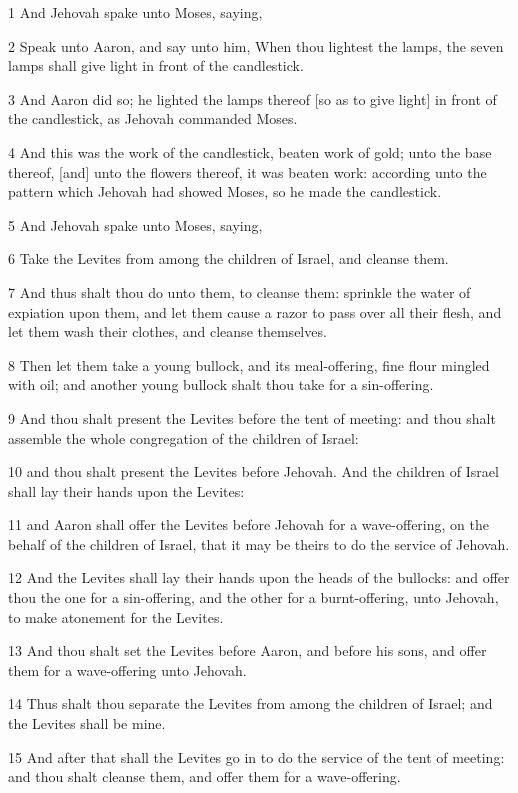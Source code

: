 \par 1 And Jehovah spake unto Moses, saying,
\par 2 Speak unto Aaron, and say unto him, When thou lightest the lamps, the seven lamps shall give light in front of the candlestick.
\par 3 And Aaron did so; he lighted the lamps thereof [so as to give light] in front of the candlestick, as Jehovah commanded Moses.
\par 4 And this was the work of the candlestick, beaten work of gold; unto the base thereof, [and] unto the flowers thereof, it was beaten work: according unto the pattern which Jehovah had showed Moses, so he made the candlestick.
\par 5 And Jehovah spake unto Moses, saying,
\par 6 Take the Levites from among the children of Israel, and cleanse them.
\par 7 And thus shalt thou do unto them, to cleanse them: sprinkle the water of expiation upon them, and let them cause a razor to pass over all their flesh, and let them wash their clothes, and cleanse themselves.
\par 8 Then let them take a young bullock, and its meal-offering, fine flour mingled with oil; and another young bullock shalt thou take for a sin-offering.
\par 9 And thou shalt present the Levites before the tent of meeting: and thou shalt assemble the whole congregation of the children of Israel:
\par 10 and thou shalt present the Levites before Jehovah. And the children of Israel shall lay their hands upon the Levites:
\par 11 and Aaron shall offer the Levites before Jehovah for a wave-offering, on the behalf of the children of Israel, that it may be theirs to do the service of Jehovah.
\par 12 And the Levites shall lay their hands upon the heads of the bullocks: and offer thou the one for a sin-offering, and the other for a burnt-offering, unto Jehovah, to make atonement for the Levites.
\par 13 And thou shalt set the Levites before Aaron, and before his sons, and offer them for a wave-offering unto Jehovah.
\par 14 Thus shalt thou separate the Levites from among the children of Israel; and the Levites shall be mine.
\par 15 And after that shall the Levites go in to do the service of the tent of meeting: and thou shalt cleanse them, and offer them for a wave-offering.

